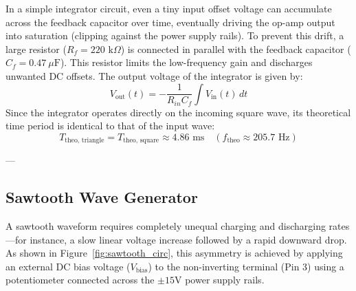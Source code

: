 \documentclass[11pt,a4paper]{article}
\begin{document}
In a simple integrator circuit, even a tiny input offset voltage can accumulate across the feedback capacitor over time, eventually driving the op-amp output into saturation (clipping against the power supply rails). To prevent this drift, a large resistor ($R_f = 220\text{ k}\Omega$) is connected in parallel with the feedback capacitor ($C_f = 0.47\ \mu\text{F}$). This resistor limits the low-frequency gain and discharges unwanted DC offsets. The output voltage of the integrator is given by:
\begin{equation}
    V_{\text{out}}(t) = -\frac{1}{R_{in} C_f} \int V_{\text{in}}(t) \, dt
    \label{eq:integ}
\end{equation}
Since the integrator operates directly on the incoming square wave, its theoretical time period is identical to that of the input wave:
\begin{equation}
    T_{\text{theo, triangle}} = T_{\text{theo, square}} \approx 4.86\text{ ms} \quad (f_{\text{theo}} \approx 205.7\text{ Hz})
\end{equation}

---

\subsection{Sawtooth Wave Generator}
A sawtooth waveform requires completely unequal charging and discharging rates—for instance, a slow linear voltage increase followed by a rapid downward drop. As shown in Figure~\ref{fig:sawtooth_circ}, this asymmetry is achieved by applying an external DC bias voltage ($V_{\text{bias}}$) to the non-inverting terminal (Pin 3) using a potentiometer connected across the $\pm 15\text{V}$ power supply rails.
\end{document}
